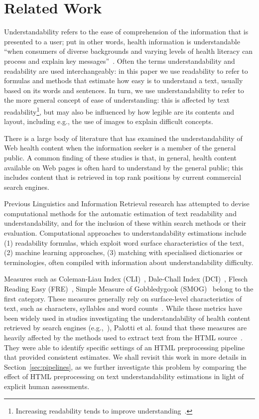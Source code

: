 \section{Related Work}
\label{sec:related}
Understandability refers to the ease of comprehension of the information that is presented to a user; put in other words, health information is understandable ``when consumers of diverse backgrounds and varying levels of health literacy can process and explain key messages''~\cite{shoemaker2014development}. Often the terms understandability and readability are used interchangeably: in this paper we use readability to refer to formulas and methods that estimate how easy is to understand a text, usually based on its words and sentences. In turn, we use understandability to refer to the more general concept of ease of understanding: this is affected by text readability\footnote{Increasing readability tends to improve understanding~\cite{ley1996use}.}, but may also be influenced by how legible are its contents and layout, including e.g., the use of images to explain difficult concepts.

There is a large body of literature that has examined the understandability of Web health content when the information seeker is a member of the general public. 
A common finding of these studies is that, in general, health content available on Web pages is often hard to understand by the general public; this includes content that is retrieved in top rank positions by current commercial search engines.

Previous Linguistics and Information Retrieval research has attempted to devise computational methods for the automatic estimation of text readability and understandability, and for the inclusion of these within search methods or their evaluation. Computational approaches to understandability estimations include (1) readability formulas, which exploit word surface characteristics of the text, (2) machine learning approaches, (3) matching with specialised dictionaries or terminologies, often compiled with information about understandability difficulty.

Measures such as Coleman-Liau Index (CLI)~\cite{cli75}, Dale-Chall Index (DCI)~\cite{dale48}, Flesch Reading Easy (FRE)~\cite{flesch75}, Simple Measure of Gobbledygook (SMOG)~\cite{smog69} belong to the first category. These measures generally rely on surface-level characteristics of text, such as characters, syllables and word counts~\cite{dubay04}.
While these metrics have been widely used in studies investigating the understandability of health content retrieved by search engines (e.g.,~\cite{becker2004study,graber99readability,fitzsimmons2010readability,wiener2013readability,patel13readability,atcherson14readability,meillier17readability}), Palotti et al. found that these measures are heavily affected by the methods used to extract text from the HTML source~\cite{palotti15}. They were able to identify specific settings of an HTML preprocessing pipeline that provided consistent  estimates. We shall revisit this work in more details in Section~\ref{sec:pipelines}, as we further investigate this problem by comparing the effect of HTML preprocessing on text understandability estimations in light of explicit human assessments. 

